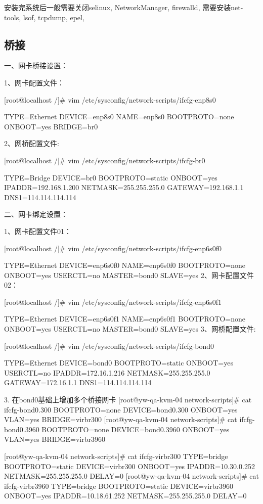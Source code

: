 安装完系统后一般需要关闭selinux, NetworkManager, firewalld, 需要安装net-tools, lsof, tcpdump, epel,

\subsection{桥接}

一、网卡桥接设置：

1、网卡配置文件：

[root@localhost /]# vim /etc/sysconfig/network-scripts/ifcfg-enp8s0

TYPE=Ethernet
DEVICE=enp8s0
NAME=enp8s0
BOOTPROTO=none
ONBOOT=yes
BRIDGE=br0

 2、网桥配置文件:

[root@localhost /]# vim /etc/sysconfig/network-scripts/ifcfg-br0

TYPE=Bridge
DEVICE=br0
BOOTPROTO=static
ONBOOT=yes
IPADDR=192.168.1.200
NETMASK=255.255.255.0
GATEWAY=192.168.1.1
DNS1=114.114.114.114


二、网卡绑定设置：

1、网卡配置文件01：

[root@localhost /]# vim /etc/sysconfig/network-scripts/ifcfg-enp6s0f0

TYPE=Ethernet
DEVICE=enp6s0f0
NAME=enp6s0f0
BOOTPROTO=none
ONBOOT=yes
USERCTL=no
MASTER=bond0
SLAVE=yes
2、网卡配置文件02：

[root@localhost /]# vim /etc/sysconfig/network-scripts/ifcfg-enp6s0f1

TYPE=Ethernet
DEVICE=enp6s0f1
NAME=enp6s0f1
BOOTPROTO=none
ONBOOT=yes
USERCTL=no
MASTER=bond0
SLAVE=yes
3、网桥配置文件:

[root@localhost /]# vim /etc/sysconfig/network-scripts/ifcfg-bond0

TYPE=Ethernet
DEVICE=bond0
BOOTPROTO=static
ONBOOT=yes
USERCTL=no
IPADDR=172.16.1.216
NETMASK=255.255.255.0
GATEWAY=172.16.1.1
DNS1=114.114.114.114

3. 在bond0基础上增加多个桥接网卡
[root@yw-qa-kvm-04 network-scripts]# cat ifcfg-bond0.300
BOOTPROTO=none
DEVICE=bond0.300
ONBOOT=yes
VLAN=yes
BRIDGE=virbr300
[root@yw-qa-kvm-04 network-scripts]# cat ifcfg-bond0.3960
BOOTPROTO=none
DEVICE=bond0.3960
ONBOOT=yes
VLAN=yes
BRIDGE=virbr3960

[root@yw-qa-kvm-04 network-scripts]# cat ifcfg-virbr300
TYPE=bridge
BOOTPROTO=static
DEVICE=virbr300
ONBOOT=yes
IPADDR=10.30.0.252
NETMASK=255.255.255.0
DELAY=0
[root@yw-qa-kvm-04 network-scripts]# cat ifcfg-virbr3960
TYPE=bridge
BOOTPROTO=static
DEVICE=virbr3960
ONBOOT=yes
IPADDR=10.18.61.252
NETMASK=255.255.255.0
DELAY=0

